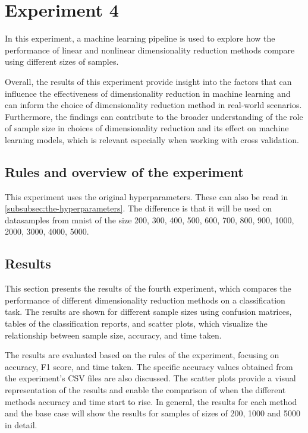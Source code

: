 \section{Experiment 4}\label{sec:experiment-4}

In this experiment, a machine learning pipeline is used to explore how the performance of linear and nonlinear dimensionality reduction methods compare using different sizes of samples.

Overall, the results of this experiment provide insight into the factors that can influence the effectiveness of dimensionality reduction in machine learning and can inform the choice of dimensionality reduction method in real-world scenarios. Furthermore, the findings can contribute to the broader understanding of the role of sample size in choices of dimensionality reduction and its effect on machine learning models, which is relevant especially when working with cross validation.

\subsection{Rules and overview of the experiment}
This experiment uses the original hyperparameters. These can also be read in \autoref{subsubsec:the-hyperparameters}. The difference is that it will be used on datasamples from \gls{mnist} of the size 200, 300, 400, 500, 600, 700, 800, 900, 1000, 2000, 3000, 4000, 5000.


\subsection{Results}\label{subsec:experiment_4_results}
This section presents the results of the fourth experiment, which compares the performance of different dimensionality reduction methods on a classification task. The results are shown for different sample sizes using confusion matrices, tables of the classification reports, and scatter plots, which visualize the relationship between sample size, accuracy, and time taken.

The results are evaluated based on the rules of the experiment, focusing on accuracy, F1 score, and time taken. The specific accuracy values obtained from the experiment's CSV files are also discussed. The scatter plots provide a visual representation of the results and enable the comparison of when the different methods accuracy and time start to rise. In general, the results for each method and the base case will show the results for samples of sizes of 200, 1000 and 5000 in detail.


